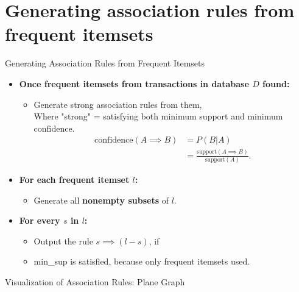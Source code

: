 \section{Generating association rules from frequent itemsets}

\begin{frame}{Generating Association Rules from Frequent Itemsets}
	\begin{itemize}
		\item \textbf{Once frequent itemsets from transactions in 
			database $D$ found:}
		\begin{itemize}
			\item Generate strong association rules from them,\\
			Where "strong" = satisfying both minimum support and 
			minimum confidence.
			\begin{align}
				\text{confidence}(A \implies B) & = 
				P(B|A)                          \\
				& = \frac{\text{support}(A \implies 
					B)}{\text{support}(A)}.
			\end{align}
		\end{itemize}
		\item \textbf{For each frequent itemset $l$:}
		\begin{itemize}
			\item Generate all \textbf{nonempty subsets} of $l$.
		\end{itemize}
		\item \textbf{For every $s$ in $l$:}
		\begin{itemize}
			\item Output the rule $s \implies (l - s)$, if
			\item min\_sup is satisfied, because only frequent itemsets 
			used.
		\end{itemize}
	\end{itemize}
\end{frame}

\begin{frame}{Visualization of Association Rules: Plane Graph}
	\centering
\end{frame}

